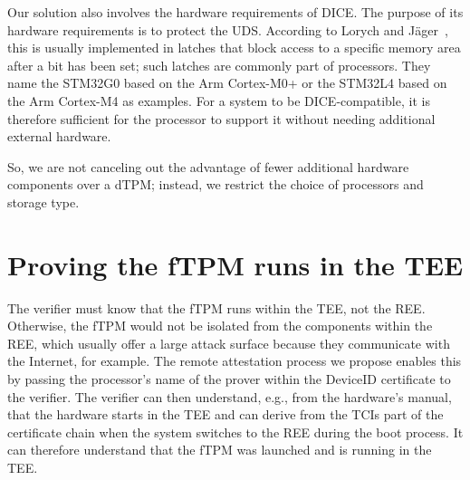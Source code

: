 


Our solution also involves the hardware requirements of DICE\@.
The purpose of its hardware requirements is to protect the \ac{UDS}\@.
According to Lorych and Jäger~\cite{Lorych2022}, this is usually implemented in latches that block access to a specific memory area after a bit has been set; such latches are commonly part of processors.
They name the STM32G0 based on the Arm Cortex-M0+ or the STM32L4 based on the Arm Cortex-M4 as examples.
For a system to be DICE-compatible, it is therefore sufficient for the processor to support it without needing additional external hardware.

So, we are not canceling out the advantage of fewer additional hardware components over a \ac{dTPM}; instead, we restrict the choice of processors and storage type.




\section{Proving the fTPM runs in the TEE}

The verifier must know that the fTPM runs within the TEE, not the REE\@.
Otherwise, the fTPM would not be isolated from the components within the REE, which usually offer a large attack surface because they communicate with the Internet, for example.
The remote attestation process we propose enables this by passing the processor's name of the prover within the DeviceID certificate to the verifier.
The verifier can then understand, e.g., from the hardware's manual, that the hardware starts in the TEE and can derive from the TCIs part of the certificate chain when the system switches to the REE during the boot process.
It can therefore understand that the fTPM was launched and is running in the TEE\@.

